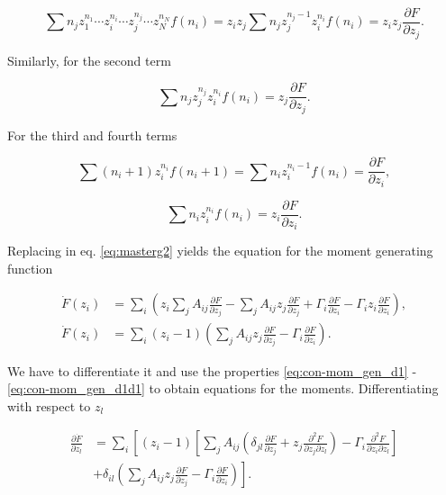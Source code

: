 \begin{equation*}
  \sum n_j z_1^{n_1}\dotsm z_i^{n_i}\dotsm z_j^{n_j}\dotsm z_N^{n_N} f(n_i) = z_iz_j\sum n_jz_j^{n_j-1}z_i^{n_i}f(n_i) = z_iz_j\frac{\partial F}{\partial z_j}. 
\end{equation*} 

Similarly, for the second term

\begin{equation*}
  \sum n_jz_j^{n_j}z_i^{n_i}f(n_i) = z_j\frac{\partial F}{\partial z_j}.
\end{equation*}

For the third and fourth terms

\begin{equation*}
  \sum (n_i+1)z_i^{n_i}f(n_i+1) = \sum n_i z_i^{n_i-1}f(n_i) = \frac{\partial F}{\partial z_i},
\end{equation*}

\begin{equation*}
  \sum n_iz_i^{n_i}f(n_i) = z_i\frac{\partial F}{\partial z_i}.
\end{equation*}

Replacing in eq. \eqref{eq:masterg2} yields the equation for the moment generating function

\begin{equation*}
  \begin{split}
    \dot{F}(z_i) &= \sum_i\left( z_i\sum_jA_{ij}\frac{\partial F}{\partial z_j} - \sum_jA_{ij} z_j \frac{\partial F}{\partial z_j} + \Gamma_i\frac{\partial F}{\partial z_i} - \Gamma_iz_i\frac{\partial F}{\partial z_i}\right),\\
    \dot{F}(z_i) &= \sum_i(z_i-1)\left(\sum_jA_{ij} z_j \frac{\partial F}{\partial z_j} - \Gamma_i\frac{\partial F}{\partial z_i}\right).
  \end{split}
\end{equation*}

We have to differentiate it and use the properties \eqref{eq:con-mom_gen_d1} - \eqref{eq:con-mom_gen_d1d1} to obtain equations for the moments. Differentiating with respect to $z_l$

\begin{equation*}
\begin{split}
\frac{\partial \dot{F}}{\partial z_l} &= \sum_i\left[(z_i-1)\left[\sum_jA_{ij}\left(\delta_{jl}\frac{\partial F}{\partial z_j}+z_j\frac{\partial^2 F}{\partial z_j\partial z_l}\right)-\Gamma_i\frac{\partial^2 F}{\partial z_i\partial z_l}\right]\right.\\
&+\left.\delta_{il}\left(\sum_jA_{ij}z_j\frac{\partial F}{\partial z_j}-\Gamma_i\frac{\partial F}{\partial z_i}\right)\right].
\end{split}
\end{equation*}

